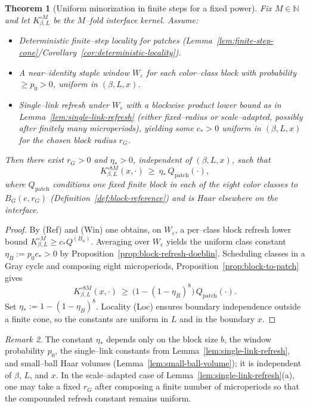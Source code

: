 \documentclass[11pt]{amsart}
\theoremstyle{plain}
\newtheorem{theorem}{Theorem}[section]
\theoremstyle{definition}
\theoremstyle{remark}
\newtheorem{remark}[theorem]{Remark}
\begin{document}
\begin{theorem}[Uniform minorization in finite steps for a fixed power]\label{thm:uniform-minorization-fixed-power}
Fix $M\in\mathbb N$ and let $K_{\beta,L}^{\circ M}$ be the $M$--fold interface kernel. Assume:
\begin{itemize}
  \item[(Loc)] Deterministic finite--step locality for patches (Lemma~\ref{lem:finite-step-cone}/Corollary~\ref{cor:deterministic-locality}).
  \item[(Win)] A near--identity staple window $W_\varepsilon$ for each color--class block with probability $\ge p_0>0$, uniform in $(\beta,L,x)$.
  \item[(Ref)] Single--link refresh under $W_\varepsilon$ with a blockwise product lower bound as in Lemma~\ref{lem:single-link-refresh} (either fixed--radius or scale--adapted, possibly after finitely many microperiods), yielding some $c_*>0$ uniform in $(\beta,L,x)$ for the chosen block radius $r_G$.
\end{itemize}
Then there exist $r_G>0$ and $\eta_*>0$, independent of $(\beta,L,x)$, such that
\[
  K_{\beta,L}^{\circ 8M}(x,\cdot)\ \ge\ \eta_*\, Q_{\mathrm{patch}}(\cdot),
\]
where $Q_{\mathrm{patch}}$ conditions one fixed finite block in each of the eight color classes to $B_G(e,r_G)$ (Definition~\ref{def:block-reference}) and is Haar elsewhere on the interface.
\end{theorem}
\begin{proof}
By (Ref) and (Win) one obtains, on $W_\varepsilon$, a per--class block refresh lower bound $K_{\beta,L}^{\circ M}\ge c_* Q^{(B_\alpha)}$. Averaging over $W_\varepsilon$ yields the uniform class constant $\eta_B:=p_0 c_*>0$ by Proposition~\ref{prop:block-refresh-doeblin}. Scheduling classes in a Gray cycle and composing eight microperiods, Proposition~\ref{prop:block-to-patch} gives
\[
  K_{\beta,L}^{\circ 8M}(x,\cdot)\ \ge\ \big(1-(1-\eta_B)^8\big)\, Q_{\mathrm{patch}}(\cdot).
\]
Set $\eta_*:=1-(1-\eta_B)^8$. Locality (Loc) ensures boundary independence outside a finite cone, so the constants are uniform in $L$ and in the boundary $x$.
\end{proof}
\begin{remark}
The constant $\eta_*$ depends only on the block size $b$, the window probability $p_0$, the single--link constants from Lemma~\ref{lem:single-link-refresh}, and small--ball Haar volumes (Lemma~\ref{lem:small-ball-volume}); it is independent of $\beta$, $L$, and $x$. In the scale--adapted case of Lemma~\ref{lem:single-link-refresh}(a), one may take a fixed $r_G$ after composing a finite number of microperiods so that the compounded refresh constant remains uniform.
\end{remark}
\end{document}

